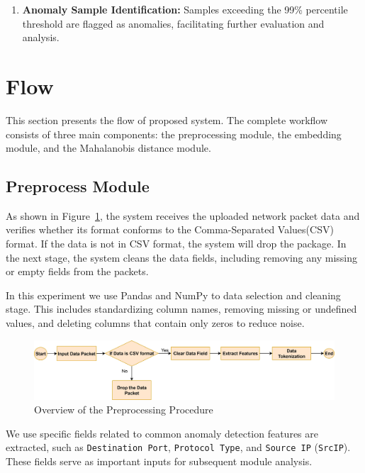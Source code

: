 \begin{ZhChapter}
\begin{enumerate}
        \item \textbf{Anomaly Sample Identification:} Samples exceeding the 99\% percentile threshold are flagged as anomalies, facilitating further evaluation and analysis.
    \end{enumerate}




    \section{Flow} %
    This section presents the flow of proposed system. The complete workflow consists of three main components: the preprocessing module, the embedding module, and the Mahalanobis distance module.

    \subsection{Preprocess Module}
    As shown in Figure~\ref{fig:FlowChart}, the system receives the uploaded network packet data and verifies whether its format conforms to the Comma-Separated Values(CSV) format. If the data is not in CSV format, the system will drop the package. In the next stage, the system cleans the data fields, including removing any missing or empty fields from the packets.

    In this experiment we use Pandas and NumPy to data selection and cleaning stage. This includes standardizing column names, removing missing or undefined values, and deleting columns that contain only zeros to reduce noise.

    \begin{figure}[htbp]
        \centering
        \includegraphics[width = 1\textwidth]{image/FlowChart.jpg}
        \caption{Overview of the Preprocessing Procedure}
        \label{fig:FlowChart}
    \end{figure}

    We use specific fields related to common anomaly detection features are extracted, such as \texttt{Destination Port}, \texttt{Protocol Type}, and \texttt{Source IP} (\texttt{SrcIP}). These fields serve as important inputs for subsequent module analysis.


\end{ZhChapter}
